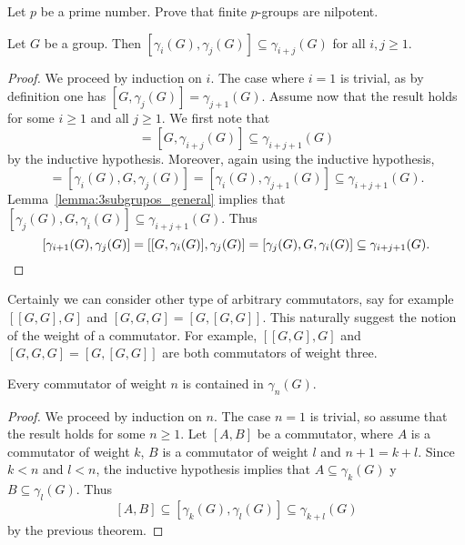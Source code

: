 \begin{exercise}
	Let $p$ be a prime number. Prove that finite $p$-groups are nilpotent. 
\end{exercise}

\begin{theorem}
	\label{theorem:gamma}
	Let $G$ be a group. Then $[\gamma_i(G),\gamma_j(G)]\subseteq
	\gamma_{i+j}(G)$ for all $i,j\geq1$.	
\end{theorem}

\begin{proof}
	We proceed by induction on $i$. The case where $i=1$ is trivial, as by definition one has 
	$[G,\gamma_j(G)]=\gamma_{j+1}(G)$. Assume now that the result holds for 
	some $i\geq1$ and all $j\geq1$. 
	We first note that 	
	\begin{equation*}
		[G,\gamma_i(G),\gamma_j(G)]=[G,\gamma_{i+j}(G)]\subseteq \gamma_{i+j+1}(G)
	\end{equation*}
	by the inductive hypothesis. Moreover, again using the inductive hypothesis,  
	\begin{equation*}
	[\gamma_i(G),\gamma_j(G),G]=[\gamma_{i}(G),G,\gamma_{j}(G)]=[\gamma_i(G),\gamma_{j+1}(G)]\subseteq \gamma_{i+j+1}(G).
	\end{equation*}
	Lemma~\ref{lemma:3subgrupos_general} implies that 
	$[\gamma_j(G),G,\gamma_i(G)]\subseteq \gamma_{i+j+1}(G)$. Thus  
	\[
	[\gamma_{i+1}(G),\gamma_{j}(G)]=[[G,\gamma_{i}(G)],\gamma_j(G)]=[\gamma_j(G),G,\gamma_i(G)]
	\subseteq \gamma_{i+j+1}(G).\qedhere
	\]
\end{proof}

Certainly we can consider other type of arbitrary commutators, say for example 
$[[G,G],G]$ and $[G,G,G]=[G,[G,G]]$. This naturally suggest the notion of the
weight of a commutator. For example, $[[G,G],G]$ and $[G,G,G]=[G,[G,G]]$ are
both commutators of weight three. 

\begin{corollary}
	Every commutator of weight $n$ is contained in 
	$\gamma_n(G)$.
\end{corollary}

\begin{proof}
	We proceed by induction on $n$. The case $n=1$ is trivial, so assume that
	the result holds for some $n\geq1$.  Let  
	$[A,B]$ be a commutator, where $A$ is a commutator of weight $k$,
	$B$ is a commutator of weight $l$ and $n+1=k+l$. Since $k<n$ and $l<n$, the inductive 
	hypothesis implies that $A\subseteq \gamma_k(G)$ y $B\subseteq
	\gamma_l(G)$. Thus 
	\[
	[A,B]\subseteq [\gamma_k(G),\gamma_l(G)]\subseteq
	\gamma_{k+l}(G)
	\]
	by the previous theorem. 
\end{proof}

